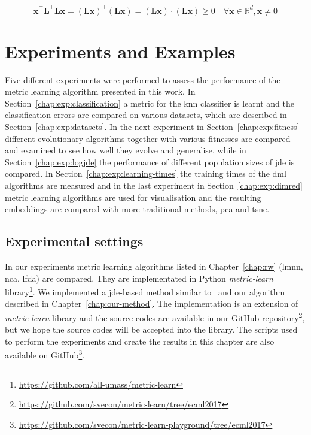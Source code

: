 \documentclass[12pt,a4paper]{report}
\begin{document}
\begin{equation}
\bm{x}^\top \bm{L}^\top \bm{L}\bm{x}=(\bm{Lx})^\top(\bm{Lx})=(\bm{Lx})\cdot (\bm{Lx})\geq 0 \quad \forall \bm{x} \in \mathbb{R}^d, \bm{x} \neq 0 \label{eq:mah:proof}
\end{equation}



\chapter{Experiments and Examples} \label{chap:exp}
Five different experiments were performed to assess the performance of the metric learning algorithm presented in this work. In Section~\ref{chap:exp:classification} a metric for the \ac{knn} classifier is learnt and the classification errors are compared on various datasets, which are described in Section~\ref{chap:exp:datasets}. In the next experiment in Section~\ref{chap:exp:fitness} different evolutionary algorithms together with various fitnesses  are compared and examined to see how well they evolve and generalise, while in Section~\ref{chap:exp:logjde} the performance of different population sizes of \ac{jde} is compared. In Section~\ref{chap:exp:learning-times} the training times of the \ac{dml} algorithms are measured and in the last experiment in Section~\ref{chap:exp:dimred} metric learning algorithms are used for visualisation and the resulting embeddings are compared with more traditional methods, \ac{pca} and \ac{tsne}.

\section{Experimental settings} 
In our experiments metric learning algorithms listed in Chapter~\ref{chap:rw} (\ac{lmnn}, \ac{nca}, \ac{lfda}) are compared. They are implementated in Python \textit{metric-learn} library\footnote{\url{https://github.com/all-umass/metric-learn}}. We implemented a \ac{jde}-based method similar to~\citep{fukui2013evolutionary} and our algorithm described in Chapter~\ref{chap:our-method}. The implementation is an extension of \textit{metric-learn} library and the source codes are available in our GitHub repository\footnote{\url{https://github.com/svecon/metric-learn/tree/ecml2017}}, but we hope the source codes will be accepted into the library. The scripts used to perform the experiments and create the results in this chapter are also available on GitHub\footnote{\url{https://github.com/svecon/metric-learn-playground/tree/ecml2017}}.
\end{document}
